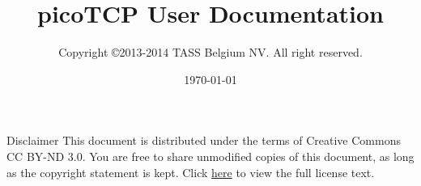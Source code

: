 %






\usepackage{longtable}


\usepackage[compact]{titlesec}

\usepackage{enumitem}

\usepackage{hyperref}
\setcounter{tocdepth}{1}




\title{picoTCP User Documentation}
\author{Copyright \copyright 2013-2014 TASS Belgium NV. All right reserved.}
\maketitle
\date{\today}
\maketitle

\thispagestyle{empty}

Disclaimer
This document is distributed under the terms of Creative Commons CC BY-ND 3.0.
You are free to share unmodified copies of this document, as long as the copyright
statement is kept. Click \href{http://creativecommons.org/licenses/by-nd/3.0/} {here} to view the full license text.


